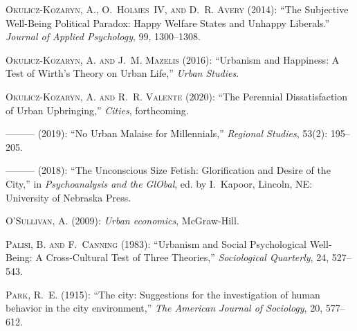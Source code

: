 \documentclass[11pt, letterpaper]{article}
\begin{document}
\begin{spacing}{1.4}
\begin{thebibliography}{92}
\textsc{Okulicz-Kozaryn, A., O.~Holmes~IV, and D.~R. Avery} (2014):
  \enquote{The Subjective Well-Being Political Paradox: Happy Welfare States
  and Unhappy Liberals.} \emph{Journal of Applied Psychology}, 99, 1300--1308.

\textsc{Okulicz-Kozaryn, A. and J.~M. Mazelis} (2016): \enquote{Urbanism and
  Happiness: A Test of Wirth's Theory on Urban Life,} \emph{Urban Studies}.
 
\textsc{Okulicz-Kozaryn, A. and R.~R. Valente} (2020): \enquote{The Perennial Dissatisfaction of Urban Upbringing,} \emph{Cities}, forthcoming.  
  
---\hspace{-.1pt}---\hspace{-.1pt}--- (2019): \enquote{No Urban Malaise for
  Millennials,} \emph{Regional Studies}, 53(2): 195--205.

---\hspace{-.1pt}---\hspace{-.1pt}--- (2018): \enquote{The Unconscious
  Size Fetish: Glorification and Desire of the City,} in \emph{Psychoanalysis
  and the GlObal}, ed. by I.~Kapoor, Lincoln, NE: University of Nebraska Press.

\textsc{O'Sullivan, A.} (2009): \emph{Urban economics}, McGraw-Hill.

\textsc{Palisi, B. and F.~Canning} (1983): \enquote{Urbanism and Social
  Psychological Well-Being: A Cross-Cultural Test of Three Theories,}
  \emph{Sociological Quarterly}, 24, 527--543.

\textsc{Park, R.~E.} (1915): \enquote{The city: Suggestions for the
  investigation of human behavior in the city environment,} \emph{The American
  Journal of Sociology}, 20, 577--612.


\end{thebibliography}
\end{spacing}
\end{document}
